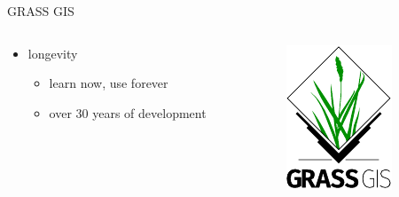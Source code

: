 \documentclass[xcolor={dvipsnames,usenames},beamer,aspectratio=169]{beamer}
\begin{document}
\begin{frame}{GRASS GIS}

\begin{columns}
\begin{column}{0.4\textwidth}

\begin{itemize}
  \item longevity
  \begin{itemize}
  \item learn now, use forever
  \item over 30 years of development
  \end{itemize}
\end{itemize}

\end{column}
\begin{column}{0.3\textwidth}

\begin{center}
  \includegraphics[width=\textwidth]{logos/grass_gis}
\end{center}

\end{column}
\end{columns}

\end{frame}
\end{document}
